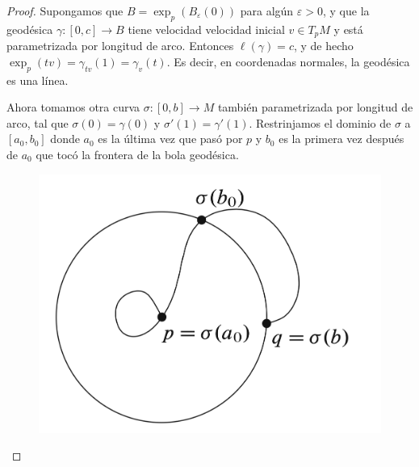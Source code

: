 \documentclass[spanish]{book}
\theoremstyle{definition}
\begin{document}
	\begin{proof}
		Supongamos que $B=\exp_p(B_\varepsilon(0))$ para algún $\varepsilon>0$, y que la geodésica $\gamma:[0,c]\to B$ tiene velocidad velocidad inicial $v\in T_pM$ y está parametrizada por longitud de arco. Entonces $\ell(\gamma)=c$, y de hecho $\exp_p(tv)=\gamma_{tv}(1)=\gamma_v(t)$. Es decir, en coordenadas normales, la geodésica es una línea.
		
		Ahora tomamos otra curva $\sigma:[0,b]\to M$ también parametrizada por longitud de arco, tal que $\sigma(0)=\gamma(0)$ y $\sigma'(1)=\gamma'(1)$. Restrinjamos el dominio de $\sigma$ a $[a_0,b_0]$ donde $a_0$ es la última vez que pasó por $p$ y $b_0$ es la primera vez después de $a_0$ que tocó la frontera de la bola geodésica.
		
		\begin{figure}[H]
			\centering
			\includegraphics[width=0.4\linewidth]{fig21}
		\end{figure}


\end{proof}
\end{document}
